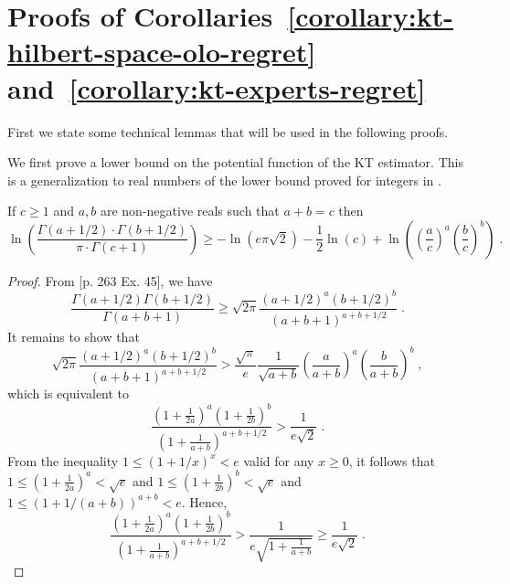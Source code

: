 \section{Proofs of Corollaries~\ref{corollary:kt-hilbert-space-olo-regret} and~\ref{corollary:kt-experts-regret}}
\label{section:corollaries_reductions}

First we state some technical lemmas that will be used in the following proofs.

We first prove a lower bound on the potential function of the \ac{KT} estimator. This is a generalization to real numbers of the lower bound proved for integers in \citet{WillemsST95}.
\begin{lemma}
\label{lemma:approx_gamma_real}
If $c \ge 1$ and $a,b$ are non-negative reals such that $a + b = c$ then
$$
\ln \left(\frac{\Gamma(a + 1/2) \cdot \Gamma(b + 1/2)}{\pi \cdot \Gamma(c+1)} \right)
\ge - \ln(e \pi \sqrt{2}) -\frac{1}{2} \ln(c) +\ln \left(\left( \frac{a}{c} \right)^a \left( \frac{b}{c} \right)^b\right) \; .
$$
\end{lemma}
%
\begin{proof}
From \cite{WhittakerW27}[p. 263 Ex. 45], we have
\[
\frac{\Gamma(a+1/2)\Gamma(b+1/2)}{\Gamma(a+b+1)} \ge \sqrt{2\pi} \frac{(a+1/2)^a (b+1/2)^b}{(a+b+1)^{a+b+1/2}} \; .
\]
It remains to show that
$$
\sqrt{2\pi} \frac{(a+1/2)^a (b+1/2)^b}{(a+b+1)^{a+b+1/2}} > \frac{\sqrt{\pi}}{e} \frac{1}{\sqrt{a+b}} \left( \frac{a}{a+b} \right)^a \left( \frac{b}{a+b} \right)^b \; ,
$$
which is equivalent to
$$
\frac{(1+\frac{1}{2a})^a (1+\frac{1}{2b})^b}{(1+\frac{1}{a+b})^{a+b+1/2}} > \frac{1}{e\sqrt{2}} \; .
$$
From the inequality $1 \le (1+1/x)^x < e$ valid for any $x \ge 0$, it follows
that $1 \le (1+\frac{1}{2a})^a < \sqrt{e}$ and $1 \le (1+\frac{1}{2b})^b < \sqrt{e}$
and $1 \le (1+1/(a+b))^{a+b} < e$. Hence,
$$
\frac{(1+\frac{1}{2a})^a (1+\frac{1}{2b})^b}{(1+\frac{1}{a+b})^{a+b+1/2}}
> \frac{1}{e \sqrt{1 + \frac{1}{a+b}}}
\ge \frac{1}{e \sqrt{2}} \; .
$$
\end{proof}


